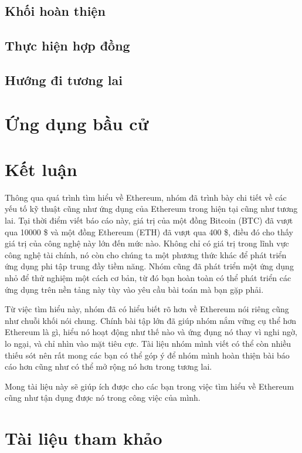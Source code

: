 \documentclass[12pt]{article}
\begin{document}
		\subsection{Khối hoàn thiện}
		
		
		\subsection{Thực hiện hợp đồng}
		
		
		\subsection{Hướng đi tương lai}
			
	
	\newpage
	\section{Ứng dụng bầu cử}
	

	\newpage
	\section{Kết luận}
	Thông qua quá trình tìm hiểu về Ethereum, nhóm đã trình bày chi tiết về các yếu tố kỹ thuật cũng như ứng dụng của Ethereum trong hiện tại cũng như tương lai. Tại thời điểm viết báo cáo này, giá trị của một đồng Bitcoin (BTC) đã vượt qua 10000 \$ và một đồng Ethereum (ETH) đã vượt qua 400 \$, điều đó cho thấy giá trị của công nghệ này lớn đến mức nào. Không chỉ có giá trị trong lĩnh vực công nghệ tài chính, nó còn cho chúng ta một phương thức khác để phát triển ứng dụng phi tập trung đầy tiềm năng. Nhóm cũng đã phát triển một ứng dụng nhỏ để thử nghiệm một cách cơ bản, từ đó bạn hoàn toàn có thể phát triển các ứng dụng trên nền tảng này tùy vào yêu cầu bài toán mà bạn gặp phải.
	
	Từ việc tìm hiểu này, nhóm đã có hiểu biết rõ hơn về Ethereum nói riêng cũng như chuỗi khối nói chung. Chính bài tập lớn đã giúp nhóm nắm vững cụ thể hơn Ethereum là gì, hiểu nó hoạt động như thế nào và ứng đụng nó thay vì nghi ngờ, lo ngại, và chỉ nhìn vào mặt tiêu cực. Tài liệu nhóm mình viết có thể còn nhiều thiếu sót nên rất mong các bạn có thể góp ý để nhóm mình hoàn thiện bài báo cáo hơn cũng như có thể mở rộng nó hơn trong tương lai.
	
	Mong tài liệu này sẽ giúp ích được cho các bạn trong việc tìm hiểu về Ethereum cũng như tận dụng được nó trong công việc của mình.

	\newpage
	\section{Tài liệu tham khảo}
	
\end{document}
